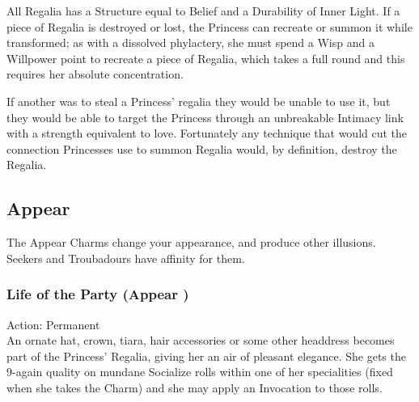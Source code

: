 All Regalia has a Structure equal to Belief and a Durability of Inner Light. If a piece of Regalia is destroyed or lost, the Princess can recreate or summon it while transformed; as with a dissolved phylactery, she must spend a Wisp and a Willpower point to recreate a piece of Regalia, which takes a full round and this requires her absolute concentration. 

If another was to steal a Princess' regalia they would be unable to use it, but they would be able to target the Princess through an unbreakable Intimacy link with a strength equivalent to love. Fortunately any technique that would cut the connection Princesses use to summon Regalia would, by definition, destroy the Regalia.  



\subsection*{Appear}

The Appear Charms change your appearance, and produce other illusions. Seekers and Troubadours have affinity for them. 

\subsubsection*{Life of the Party (Appear \textbullet)}
\noindent Action: Permanent \\

\noindent An ornate hat, crown, tiara, hair accessories or some other headdress becomes part of the Princess' Regalia, giving her an air of pleasant elegance. She gets the 9-again quality on mundane Socialize rolls within one of her specialities (fixed when she takes the Charm) and she may apply an Invocation to those rolls.\\

